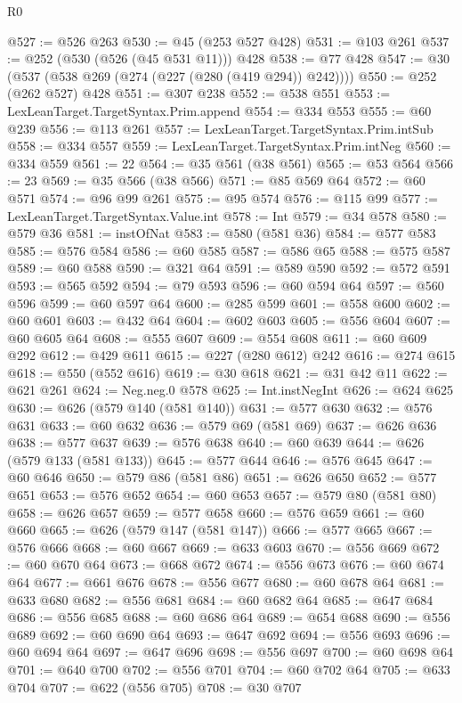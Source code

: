 \begin{lexlean}{R0}
\begin{coremodule}
@527 := @526 @263
@530 := @45 (@253 @527 @428)
@531 := @103 @261
@537 := @252 (@530 (@526 (@45 @531 @11))) @428
@538 := @77 @428
@547 := @30 (@537 (@538 @269 (@274 (@227 (@280 (@419 @294)) @242))))
@550 := @252 (@262 @527) @428
@551 := @307 @238
@552 := @538 @551
@553 := LexLeanTarget.TargetSyntax.Prim.append
@554 := @334 @553
@555 := @60 @239
@556 := @113 @261
@557 := LexLeanTarget.TargetSyntax.Prim.intSub
@558 := @334 @557
@559 := LexLeanTarget.TargetSyntax.Prim.intNeg
@560 := @334 @559
@561 := 22
@564 := @35 @561 (@38 @561)
@565 := @53 @564
@566 := 23
@569 := @35 @566 (@38 @566)
@571 := @85 @569 @64
@572 := @60 @571
@574 := @96 @99 @261
@575 := @95 @574
@576 := @115 @99
@577 := LexLeanTarget.TargetSyntax.Value.int
@578 := Int
@579 := @34 @578
@580 := @579 @36
@581 := instOfNat
@583 := @580 (@581 @36)
@584 := @577 @583
@585 := @576 @584
@586 := @60 @585
@587 := @586 @65
@588 := @575 @587
@589 := @60 @588
@590 := @321 @64
@591 := @589 @590
@592 := @572 @591
@593 := @565 @592
@594 := @79 @593
@596 := @60 @594 @64
@597 := @560 @596
@599 := @60 @597 @64
@600 := @285 @599
@601 := @558 @600
@602 := @60 @601
@603 := @432 @64
@604 := @602 @603
@605 := @556 @604
@607 := @60 @605 @64
@608 := @555 @607
@609 := @554 @608
@611 := @60 @609 @292
@612 := @429 @611
@615 := @227 (@280 @612) @242
@616 := @274 @615
@618 := @550 (@552 @616)
@619 := @30 @618
@621 := @31 @42 @11
@622 := @621 @261
@624 := Neg.neg.{0} @578
@625 := Int.instNegInt
@626 := @624 @625
@630 := @626 (@579 @140 (@581 @140))
@631 := @577 @630
@632 := @576 @631
@633 := @60 @632
@636 := @579 @69 (@581 @69)
@637 := @626 @636
@638 := @577 @637
@639 := @576 @638
@640 := @60 @639
@644 := @626 (@579 @133 (@581 @133))
@645 := @577 @644
@646 := @576 @645
@647 := @60 @646
@650 := @579 @86 (@581 @86)
@651 := @626 @650
@652 := @577 @651
@653 := @576 @652
@654 := @60 @653
@657 := @579 @80 (@581 @80)
@658 := @626 @657
@659 := @577 @658
@660 := @576 @659
@661 := @60 @660
@665 := @626 (@579 @147 (@581 @147))
@666 := @577 @665
@667 := @576 @666
@668 := @60 @667
@669 := @633 @603
@670 := @556 @669
@672 := @60 @670 @64
@673 := @668 @672
@674 := @556 @673
@676 := @60 @674 @64
@677 := @661 @676
@678 := @556 @677
@680 := @60 @678 @64
@681 := @633 @680
@682 := @556 @681
@684 := @60 @682 @64
@685 := @647 @684
@686 := @556 @685
@688 := @60 @686 @64
@689 := @654 @688
@690 := @556 @689
@692 := @60 @690 @64
@693 := @647 @692
@694 := @556 @693
@696 := @60 @694 @64
@697 := @647 @696
@698 := @556 @697
@700 := @60 @698 @64
@701 := @640 @700
@702 := @556 @701
@704 := @60 @702 @64
@705 := @633 @704
@707 := @622 (@556 @705)
@708 := @30 @707

\end{coremodule}
\end{lexlean}
